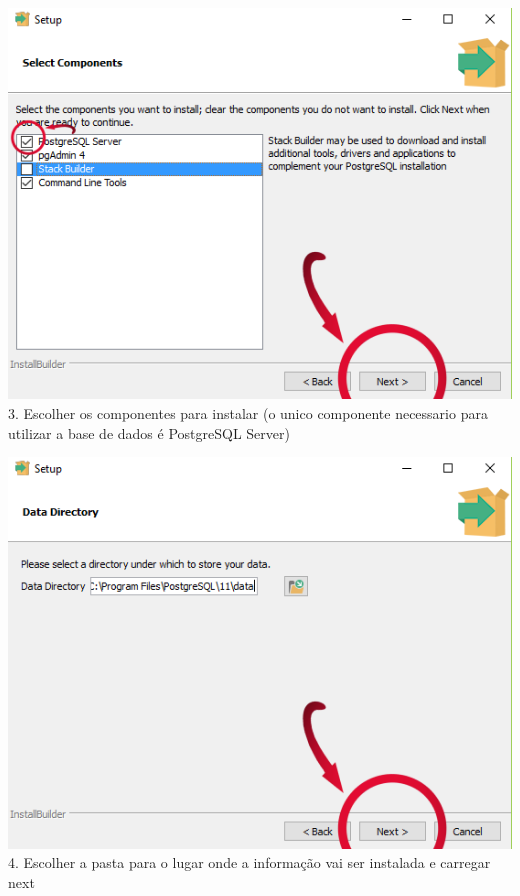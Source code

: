 \documentclass[a4paper, 11pt]{article}
\begin{document}
\begin{minipage}{0.45\textwidth}
  \includegraphics[width=\textwidth]{image.psd(2).png}
  3. Escolher os componentes para instalar (o unico componente necessario para utilizar a base de dados é PostgreSQL Server)
\end{minipage}\hfill
\begin{minipage}{0.45\textwidth}
  \includegraphics[width=\textwidth]{image.psd(3).png} 
  4. Escolher a pasta para o lugar onde a informação vai ser instalada e carregar next
\end{minipage}
\end{document}
